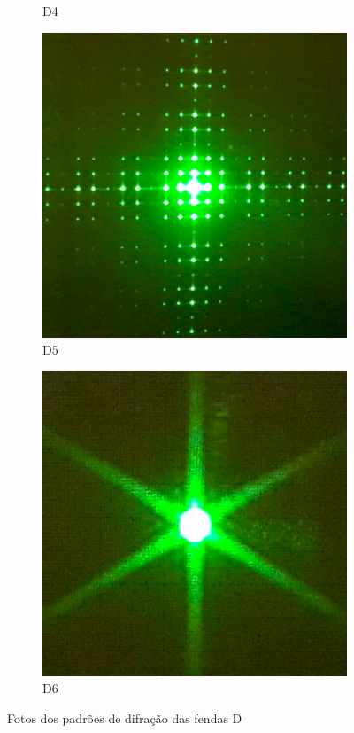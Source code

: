 \begin{figure}[H]
\begin{subfigure}[t]{.3\textwidth}
        \caption{D4}
        \label{fig:D4}
    \end{subfigure}
    \qquad
    \begin{subfigure}[t]{.3\textwidth}
        \centering
        \includegraphics[width=\textwidth]{figuras/medidas/D5.jpg}
        \caption{D5}
        \label{fig:D5}
    \end{subfigure}
    \qquad
    \begin{subfigure}[t]{.3\textwidth}
        \centering
        \includegraphics[width=\textwidth]{figuras/medidas/D6.jpg}
        \caption{D6}
        \label{fig:D6}
    \end{subfigure}

    \caption{Fotos dos padrões de difração das fendas D}
    \label{fig:D}
\end{figure}